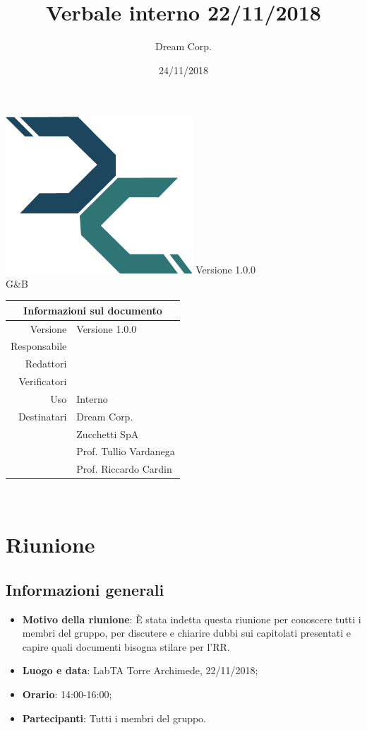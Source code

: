 \documentclass[12pt]{article}
\title{\fontsize{40}{40}\selectfont Verbale interno 22/11/2018}
\author{Dream Corp.}
\date{24/11/2018}
\newcommand{\red}{\mat}
\newcommand{\verp}{\daL}
\newcommand{\res}{\daG}
\newcommand{\version}{Versione 1.0.0}
\newcommand{\use}{Interno}
\begin{document}
\maketitle
	\begin{center}
	\hspace{5em}
	   \includegraphics[width =70mm]{../../logo.png}\newline
	\huge Versione 1.0.0 
	\\G\&B
	\begin{table}[!htpb]
		\centering
		\begin{tabular}{r|l}
			\multicolumn{2}{c}{Informazioni sul documento}\\
			\hline
			Versione & \version \\
			Responsabile & \res\\
			Redattori & \red \\
			Verificatori & \verp\\
			Uso & \use\\

			Destinatari & Dream Corp. \\
			& Zucchetti SpA\\
			& Prof. Tullio Vardanega\\
			& Prof. Riccardo Cardin\\
		\end{tabular}
	\end{table}
	\end{center}

\newline
~\newline
\section{Riunione}
    \subsection{Informazioni generali}
    \begin{itemize}
        \item \textbf{Motivo della riunione}: È stata indetta questa riunione per conoscere tutti i membri del gruppo, per discutere e chiarire dubbi sui capitolati presentati e capire quali documenti bisogna stilare per l'RR.
        \item \textbf{Luogo e data}: LabTA Torre Archimede, 22/11/2018;
        \item \textbf{Orario}: 14:00-16:00;
        \item \textbf{Partecipanti}: Tutti i membri del gruppo.

    \end{itemize}
    \newpage
\end{document}
